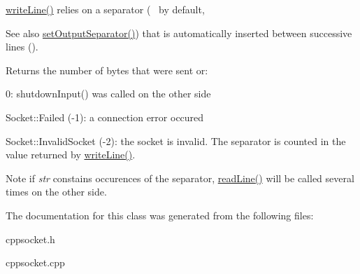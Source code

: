 \hyperlink{classcppu_1_1SocketBuffer_a92ae0351aaee8719d34e8c4618495d59}{write\+Line()} relies on a separator (~\newline
 by default, \begin{DoxySeeAlso}{See also}
\hyperlink{classcppu_1_1SocketBuffer_a0e5e6a9ce3bda28b65c559c8b3c91b0f}{set\+Output\+Separator()}) that is automatically inserted between successive lines ().
\end{DoxySeeAlso}
\begin{DoxyReturn}{Returns}
the number of bytes that were sent or\+:
\begin{DoxyItemize}
\item 0\+: shutdown\+Input() was called on the other side
\item Socket\+::\+Failed (-\/1)\+: a connection error occured
\item Socket\+::\+Invalid\+Socket (-\/2)\+: the socket is invalid. The separator is counted in the value returned by \hyperlink{classcppu_1_1SocketBuffer_a92ae0351aaee8719d34e8c4618495d59}{write\+Line()}.
\end{DoxyItemize}
\end{DoxyReturn}
\begin{DoxyNote}{Note}
if {\itshape str} constains occurences of the separator, \hyperlink{classcppu_1_1SocketBuffer_a222769d3776b9cbd3a727ee1f0e60358}{read\+Line()} will be called several times on the other side. 
\end{DoxyNote}


The documentation for this class was generated from the following files\+:\begin{DoxyCompactItemize}
\item 
cppsocket.\+h\item 
cppsocket.\+cpp\end{DoxyCompactItemize}
